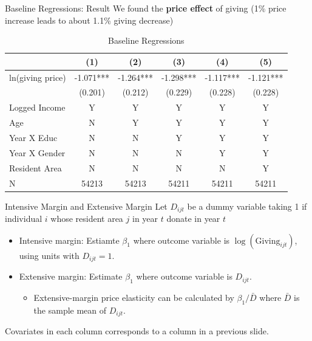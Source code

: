 \documentclass[
  ignorenonframetext,
]{beamer}
\providecommand{\tightlist}{%
  \setlength{\itemsep}{0pt}\setlength{\parskip}{0pt}}
\begin{document}
\begin{frame}{Baseline Regressions: Result}
\protect\hypertarget{baseline-regressions-result}{}
We found the \textbf{price effect} of giving (1\% price increase leads
to about 1.1\% giving decrease)

\begin{table}

\caption{\label{tab:kableEstimateElasticity}Baseline Regressions}
\centering
\fontsize{9}{11}\selectfont
\begin{tabular}[t]{lccccc}
\toprule
 & (1) & (2) & (3) & (4) & (5)\\
\midrule
ln(giving price) & -1.071*** & -1.264*** & -1.298*** & -1.117*** & -1.121***\\
 & (0.201) & (0.212) & (0.229) & (0.228) & (0.228)\\
Logged Income & Y & Y & Y & Y & Y\\
Age & N & Y & Y & Y & Y\\
Year X Educ & N & N & Y & Y & Y\\
Year X Gender & N & N & N & Y & Y\\
Resident Area & N & N & N & N & Y\\
N & 54213 & 54213 & 54211 & 54211 & 54211\\
\bottomrule
\end{tabular}
\end{table}
\end{frame}

\begin{frame}{Intensive Margin and Extensive Margin}
\protect\hypertarget{intensive-margin-and-extensive-margin}{}
Let \(D_{ijt}\) be a dummy variable taking 1 if individual \(i\) whose
resident area \(j\) in year \(t\) donate in year \(t\)

\begin{itemize}
\tightlist
\item
  Intensive margin: Estiamte \(\beta_1\) where outcome variable is
  \(\log(\text{Giving}_{ijt})\), using units with \(D_{ijt} = 1\).
\item
  Extensive margin: Estimate \(\beta_1\) where outcome variable is
  \(D_{ijt}\).

  \begin{itemize}
  \tightlist
  \item
    Extensive-margin price elasticity can be calculated by
    \(\beta_1/\bar{D}\) where \(\bar{D}\) is the sample mean of
    \(D_{ijt}\).
  \end{itemize}
\end{itemize}

Covariates in each column corresponds to a column in a previous slide.
\end{frame}
\end{document}
